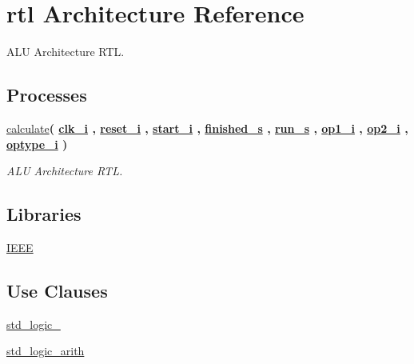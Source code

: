 \hypertarget{classalu_1_1rtl}{}\section{rtl Architecture Reference}
\label{classalu_1_1rtl}


A\+LU Architecture R\+TL.  


\subsection*{Processes}
 \begin{DoxyCompactItemize}
\item 
\hyperlink{classalu_1_1rtl_a127a47776b4d018774cd0c1842fb6038}{calculate}{\bfseries  ( {\bfseries {\bfseries \hyperlink{classalu_abe949478e3f8aad0a6aeb1842fa6c608}{clk\+\_\+i}} \textcolor{vhdlchar}{ }} , {\bfseries {\bfseries \hyperlink{classalu_a55da7e76960757f8c6842e86a28ee7be}{reset\+\_\+i}} \textcolor{vhdlchar}{ }} , {\bfseries {\bfseries \hyperlink{classalu_aba7911228d421cdfd5fc4eb74a60572c}{start\+\_\+i}} \textcolor{vhdlchar}{ }} , {\bfseries {\bfseries \hyperlink{classalu_1_1rtl_abb13f4e66b38434991c4a6e11a842d8e}{finished\+\_\+s}} \textcolor{vhdlchar}{ }} , {\bfseries {\bfseries \hyperlink{classalu_1_1rtl_af4334e2915fc133abca5cbbac4312fcf}{run\+\_\+s}} \textcolor{vhdlchar}{ }} , {\bfseries {\bfseries \hyperlink{classalu_a1127482098676cfc6ce7e98ba675ee27}{op1\+\_\+i}} \textcolor{vhdlchar}{ }} , {\bfseries {\bfseries \hyperlink{classalu_ae346648ed4ed2217b5e8d668b165aff2}{op2\+\_\+i}} \textcolor{vhdlchar}{ }} , {\bfseries {\bfseries \hyperlink{classalu_aee662ea38c86cd2e7dc1970ce8a6d5e9}{optype\+\_\+i}} \textcolor{vhdlchar}{ }} )}
\begin{DoxyCompactList}\small\item\em A\+LU Architecture R\+TL. \end{DoxyCompactList}\end{DoxyCompactItemize}
\subsection*{Libraries}
 \begin{DoxyCompactItemize}
\item 
\hyperlink{classalu_1_1rtl_ae4f03c286607f3181e16b9aa12d0c6d4}{I\+E\+EE} 
\end{DoxyCompactItemize}
\subsection*{Use Clauses}
 \begin{DoxyCompactItemize}
\item 
\hyperlink{classalu_1_1rtl_acd03516902501cd1c7296a98e22c6fcb}{std\+\_\+logic\+\_}   
\item 
\hyperlink{classalu_1_1rtl_a0f5ecc6613f63d07f7963a97b1b26095}{std\+\_\+logic\+\_\+arith}   
\end{DoxyCompactItemize}

